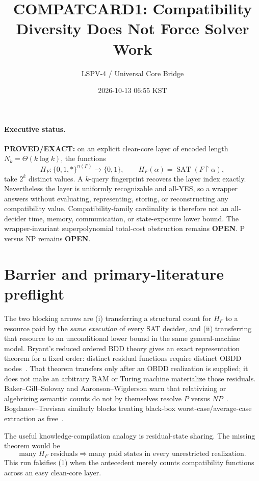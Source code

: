 \documentclass[11pt]{article}
\title{COMPATCARD1: Compatibility Diversity Does Not Force Solver Work}
\author{LSPV-4 / Universal Core Bridge}
\date{2026-10-13 06:55 KST}
\newcommand{\Status}[1]{\textbf{#1}}
\begin{document}
\maketitle

\paragraph{Executive status.}
\Status{PROVED/EXACT:} on an explicit clean-core layer of encoded length
\(N_k=\Theta(k\log k)\), the functions
\[
 H_F:\{0,1,*\}^{n(F)}\to\{0,1\},\qquad
 H_F(\alpha)=\operatorname{SAT}(F\upharpoonright\alpha),
\]
take \(2^k\) distinct values.  A \(k\)-query fingerprint recovers the layer
index exactly.  Nevertheless the layer is uniformly recognizable and all-YES,
so a wrapper answers without evaluating, representing, storing, or
reconstructing any compatibility value.  Compatibility-family cardinality is
therefore not an all-decider time, memory, communication, or state-exposure
lower bound.  The wrapper-invariant superpolynomial total-cost obstruction
remains \Status{OPEN}.  P versus NP remains \Status{OPEN}.

\section{Barrier and primary-literature preflight}
The two blocking arrows are (i) transferring a structural count for \(H_F\)
to a resource paid by the \emph{same execution} of every SAT decider, and
(ii) transferring that resource to an unconditional lower bound in the same
general-machine model.  Bryant's reduced ordered BDD theory gives an exact
representation theorem for a fixed order: distinct residual functions require
distinct OBDD nodes~\cite{Bryant86}.  That theorem transfers only after an
OBDD realization is supplied; it does not make an arbitrary RAM or Turing
machine materialize those residuals.  Baker--Gill--Solovay and
Aaronson--Wigderson warn that relativizing or algebrizing semantic counts do
not by themselves resolve \(P\) versus \(NP\)~\cite{BGS75,AW09}.
Bogdanov--Trevisan similarly blocks treating black-box worst-case/average-case
extraction as free~\cite{BT06}.

The useful knowledge-compilation analogy is residual-state sharing.  The
missing theorem would be
\[
 \text{many }H_F\text{ residuals}\Longrightarrow
 \text{many paid states in every unrestricted realization}.              \tag{1}
\]
This run falsifies (1) when the antecedent merely counts compatibility
functions across an easy clean-core layer.
\end{document}
